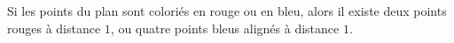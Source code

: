 Si les points du plan sont coloriés en rouge ou en bleu, alors il existe deux points rouges à distance $1$, ou quatre points bleus alignés à distance $1$.
